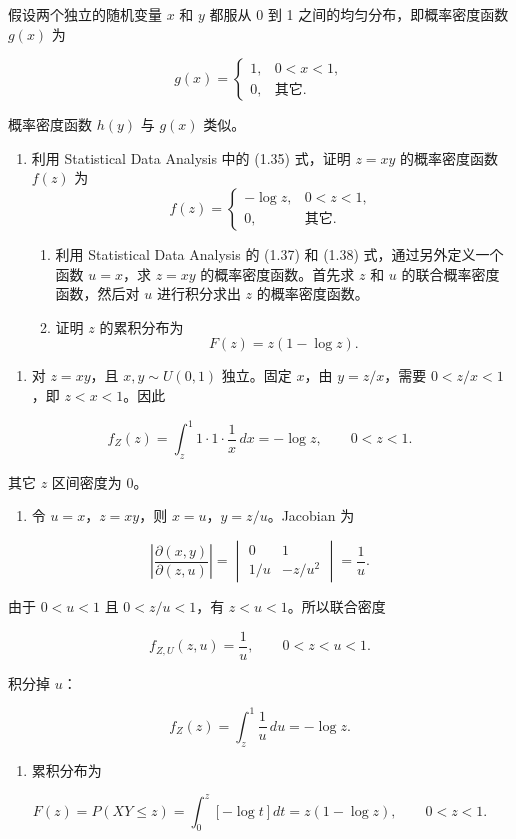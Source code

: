 \begin{question}
假设两个独立的随机变量 \(x\) 和 \(y\) 都服从 0 到 1 之间的均匀分布，即概率密度函数 \(g(x)\) 为

\[
g(x)=\begin{cases}
1, & 0<x<1,\\
0, & \text{其它}.
\end{cases}
\]

概率密度函数 \(h(y)\) 与 \(g(x)\) 类似。

\begin{enumerate}
\item 利用 Statistical Data Analysis 中的 (1.35) 式，证明 \(z=xy\) 的概率密度函数 \(f(z)\) 为
\[
f(z)=\begin{cases}
-\log z, & 0<z<1,\\
0, & \text{其它}.
\end{cases}
\]

\begin{enumerate}[start=2]
\item
  利用 Statistical Data Analysis 的 (1.37) 和 (1.38)
  式，通过另外定义一个函数 \(u=x\)，求 \(z=xy\) 的概率密度函数。首先求 \(z\) 和
  \(u\) 的联合概率密度函数，然后对 \(u\) 进行积分求出 \(z\) 的概率密度函数。
\item
  证明 \(z\) 的累积分布为
\[
  F(z)=z(1-\log z).
  \]
\end{enumerate}
\end{enumerate}
\begin{solution}
\begin{enumerate}
\item
  对 \(z=xy\)，且 \(x,y\sim U(0,1)\) 独立。固定 \(x\)，由
  \(y=z/x\)，需要 \(0<z/x<1\)，即 \(z<x<1\)。因此
\end{enumerate}

\[
f_Z(z)=\int_z^1 1\cdot1\cdot\frac{1}{x}\,dx=-\log z,\qquad 0<z<1.
\]

其它 \(z\) 区间密度为 0。

\begin{enumerate}[start=2]
\item
  令 \(u=x\)，\(z=xy\)，则 \(x=u\)，\(y=z/u\)。Jacobian 为
\end{enumerate}

\[
\left|\frac{\partial(x,y)}{\partial(z,u)}\right|=
\begin{vmatrix}
0&1\\
1/u&-z/u^2
\end{vmatrix}=\frac{1}{u}.
\]

由于 \(0<u<1\) 且 \(0<z/u<1\)，有 \(z<u<1\)。所以联合密度

\[
f_{Z,U}(z,u)=\frac1u,\qquad 0<z<u<1.
\]

积分掉 \(u\)：

\[
f_Z(z)=\int_z^1\frac1u\,du=-\log z.
\]

\begin{enumerate}[start=3]
\item
  累积分布为
\end{enumerate}

\[
F(z)=P(XY\le z)=\int_0^z[-\log t]dt=z(1-\log z),\qquad 0<z<1.
\]
\end{solution}
\end{question}



